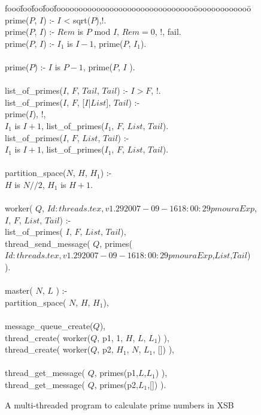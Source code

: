 \begin{figure}
\begin{center}
\begin{tt}
\begin{tabbing}
fooo\=foo\=foo\=foo\=fooooooooooooooooooooooooooooooo\=ooooooooooooo\=\kill
prime($P$, $I$) :- $I$ < sqrt($P$),!.\\
prime($P$, $I$) :- $Rem$ is $P$ mod $I$, $Rem = 0$, !, fail.\\
prime($P$, $I$) :- $I_1$ is $I - 1$, prime($P$, $I_1$).\\
\\
prime($P$) :- $I$ is $P - 1$, prime($P$, $I$ ).\\
\\
list\_of\_primes($I$, $F$, $Tail$, $Tail$) :- $I > F$, !.\\
list\_of\_primes($I$, $F$, [$I$|$List$], $Tail$) :-\\
\>        prime($I$), !,\\
\>        $I_1$ is $I + 1$, list\_of\_primes($I_1$, $F$, $List$, $Tail$).\\
list\_of\_primes($I$, $F$, $List$, $Tail$) :-\\
\>        $I_1$ is $I + 1$, list\_of\_primes($I_1$, $F$, $List$, $Tail$).\\
\\
partition\_space($N$, $H$, $H_1$) :-\\
\>        $H$ is $N//2$, $H_1$ is $H + 1$.\\
\\
worker( $Q$, $Id: threads.tex,v 1.29 2007-09-16 18:00:29 pmoura Exp $, $I$, $F$, $List$, $Tail$) :-\\
\>        list\_of\_primes( $I$, $F$, $List$, $Tail$),\\
\>        thread\_send\_message( $Q$, primes($Id: threads.tex,v 1.29 2007-09-16 18:00:29 pmoura Exp $,$List$,$Tail$) ).\\
\\
master( $N$, $L$ )  :-\\
\>        partition\_space( $N$, $H$, $H_1$),\\
\\
\>       message\_queue\_create($Q$),\\
\>        thread\_create( worker($Q$, p1, 1,  $H$, $L$,  $L_1$) ),\\
\>        thread\_create( worker($Q$, p2, $H_1$, $N$, $L_1$, []) ),\\
\\
\>        thread\_get\_message( $Q$, primes(p1,$L$,$L_1$) ),\\
\>        thread\_get\_message( $Q$, primes(p2,$L_1$,[]) ).
\end{tabbing}
\end{tt}
\end{center}
\caption{A multi-threaded program to calculate prime numbers in XSB}
\label{fig:ex-primes}
\end{figure}


